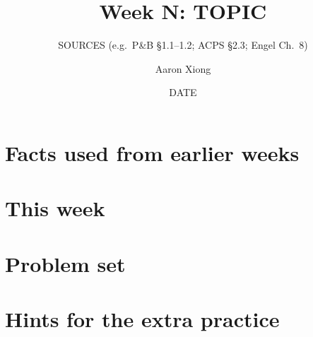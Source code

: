 \documentclass[10pt]{scrartcl}
\title{Week N: TOPIC}
\subtitle{SOURCES (e.g.\ P\&B \S1.1--1.2; ACPS \S2.3; Engel Ch.~8)}
\author{Aaron Xiong}
\date{DATE}
\begin{document}
\maketitle

\section{Facts used from earlier weeks}

\section{This week}

\section{Problem set}

\section*{Hints for the extra practice}
\end{document}
